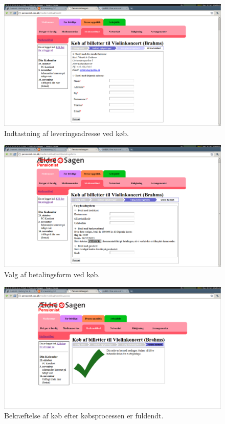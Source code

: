 \begin{figure}[h]
    \centering
    \includegraphics[width=.95\textwidth]{billeder/opgave2_trin4.png}
    \caption{Indtastning af leveringsadresse ved køb.}
    \label{fig:opg2_trin4}
\end{figure}
\begin{figure}[h]
    \centering
    \includegraphics[width=.95\textwidth]{billeder/opgave2_trin5.png}
    \caption{Valg af betalingsform ved køb.}
    \label{fig:opg2_trin5}
\end{figure}
\begin{figure}[h]
    \centering
    \includegraphics[width=.95\textwidth]{billeder/opgave2_trin6.png}
    \caption{Bekræftelse af køb efter købsprocessen er fuldendt.}
    \label{fig:opg2_trin6}
\end{figure}

